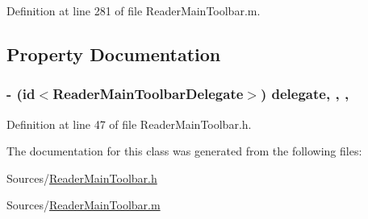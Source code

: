 Definition at line 281 of file Reader\-Main\-Toolbar.\-m.



\subsection{Property Documentation}
\hypertarget{interface_reader_main_toolbar_ac49604961559e4c0f54d137e63af866b}{
\subsubsection[{delegate}]{\setlength{\rightskip}{0pt plus 5cm}-\/ (id$<${\bf Reader\-Main\-Toolbar\-Delegate}$>$) delegate\hspace{0.3cm}{\ttfamily [read]}, {\ttfamily [write]}, {\ttfamily [nonatomic]}, {}}}\label{dd/dd4/interface_reader_main_toolbar_ac49604961559e4c0f54d137e63af866b}


Definition at line 47 of file Reader\-Main\-Toolbar.\-h.



The documentation for this class was generated from the following files\-:\begin{DoxyCompactItemize}
\item 
Sources/\hyperlink{_reader_main_toolbar_8h}{Reader\-Main\-Toolbar.\-h}\item 
Sources/\hyperlink{_reader_main_toolbar_8m}{Reader\-Main\-Toolbar.\-m}\end{DoxyCompactItemize}
